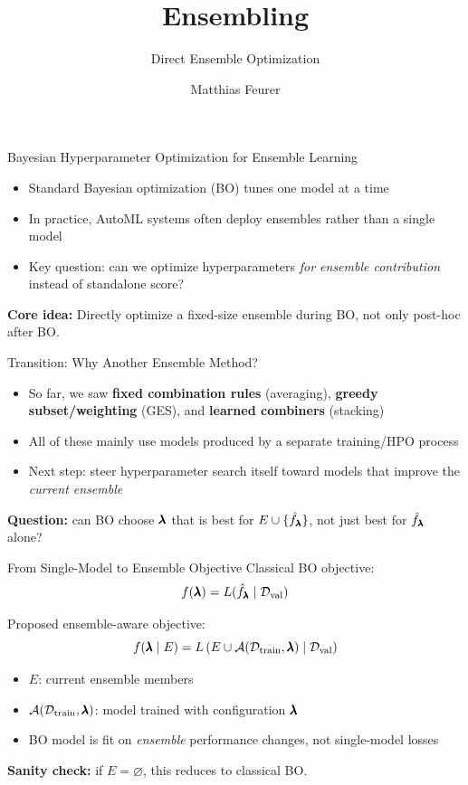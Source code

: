 \documentclass[main]{subfiles}
\title[AutoML: Ensembling]{Ensembling}
\subtitle{Direct Ensemble Optimization}
\author[Matthias Feurer]{Matthias Feurer}
\date{}
\begin{document}
\maketitle

\begin{frame}{Bayesian Hyperparameter Optimization for Ensemble Learning~}
\small
\vspace{0.2cm}
\begin{itemize}
    \item Standard Bayesian optimization (BO) tunes one model at a time
    \item In practice, AutoML systems often deploy ensembles rather than a single model
    \item Key question: can we optimize hyperparameters \emph{for ensemble contribution} instead of standalone score?
\end{itemize}
\vspace{0.2cm}
\textbf{Core idea:} Directly optimize a fixed-size ensemble during BO, not only post-hoc after BO.
\vspace{0.2cm}

\end{frame}

\begin{frame}{Transition: Why Another Ensemble Method?}
\small
\begin{itemize}
    \item So far, we saw \textbf{fixed combination rules} (averaging), \textbf{greedy subset/weighting} (GES), and \textbf{learned combiners} (stacking)
    \item All of these mainly use models produced by a separate training/HPO process
    \item Next step: steer hyperparameter search itself toward models that improve the \emph{current ensemble}
\end{itemize}
\vspace{0.2cm}
\textbf{Question:} can BO choose $\conf$ that is best for $E \cup \{\bl[\conf]\}$, not just best for $\bl[\conf]$ alone?
\end{frame}

\begin{frame}{From Single-Model to Ensemble Objective}
\small
Classical BO objective:
\[
f(\conf) = \loss(\bl[\conf] \mid \datasetval)
\]

Proposed ensemble-aware objective:
\[
f(\conf \mid E) = \loss\left(E \cup \algo(\datasettrain, \conf) \mid \datasetval\right)
\]
\begin{itemize}
    \item $E$: current ensemble members
    \item $\algo(\datasettrain, \conf)$: model trained with configuration $\conf$
    \item BO model is fit on \emph{ensemble} performance changes, not single-model losses
\end{itemize}
\vspace{0.1cm}
\textbf{Sanity check:} if $E=\varnothing$, this reduces to classical BO.
\end{frame}
\end{document}
